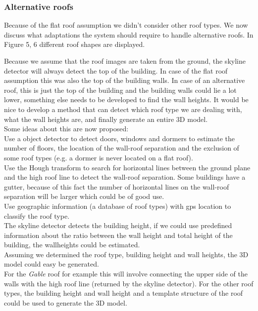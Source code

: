 \documentclass[10pt]{article}
\begin{document}
\subsubsection{Alternative roofs}
Because of the flat roof assumption we didn't consider other roof types.
We now discuss what adaptations the system should require to handle alternative roofs.
In Figure 5, 6 different roof shapes are displayed.\\

Because we assume that the roof images are taken from the ground, the skyline
detector will always detect the top of the building. In case of the flat roof
assumption this was also the top of the building walls.
In case of an alternative roof, this is just the top of the building and the building walls could lie a lot lower, something
else needs to be developed to find the wall heights. It would be nice to develop a method that can detect which roof type we are dealing with, what the wall heights are, and finally generate an entire 3D model.\\
Some ideas about this are now proposed:\\
Use a object detector to detect doors, windows and dormers to estimate the
number of floors, the location of the wall-roof separation and the exclusion of
some roof types (e.g. a dormer is never located on a flat roof).\\
Use the Hough transform to search for horizontal lines between the ground plane and the
high roof line to detect the wall-roof separation. Some buildings have a gutter,
because of this fact the number of horizontal lines on the wall-roof separation
will be larger which could be of good use.\\
Use geographic information (a database of roof types) with gps location
to classify the roof type. \\
The skyline detector detects the building height, if we
could use predefined information about the ratio between the wall height and
total height of the building, the wallheights could be estimated.\\
Assuming we determined the roof type, building height and wall heights, the 3D model could 
easy be generated. \\
For the \emph{Gable} roof for example this will involve connecting the upper side of the
walls with the high roof line (returned by the skyline detector). For the other
roof types, the building height and wall height and a template structure of the
roof could be used to generate the 3D model.
\end{document}
